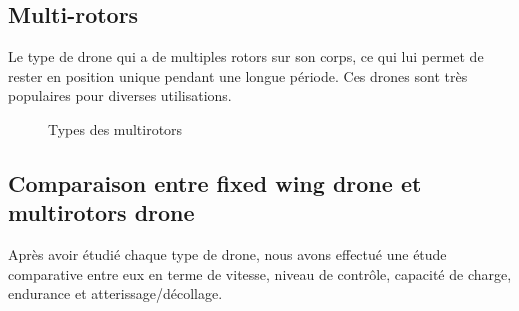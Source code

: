 \documentclass[a4paper,12pt]{report}
\begin{document}
	\subsection{Multi-rotors}
	Le type de drone qui a de multiples rotors sur son corps, ce qui lui permet de rester en position unique pendant une longue période. Ces drones sont très populaires pour diverses utilisations.	
	
	\begin {figure}[h] 
	\begin{center} 
		\centering
		
	\end{center}
	
	\caption{Types des multirotors}
	\end{figure}
	
	
	
	
	
	
	
	\subsection{Comparaison entre fixed wing drone et multirotors drone}
	Après avoir étudié chaque type de drone, nous avons effectué une étude comparative entre eux en terme de vitesse, niveau de contrôle, capacité de charge, endurance et atterissage/décollage.
	
\end{document}
